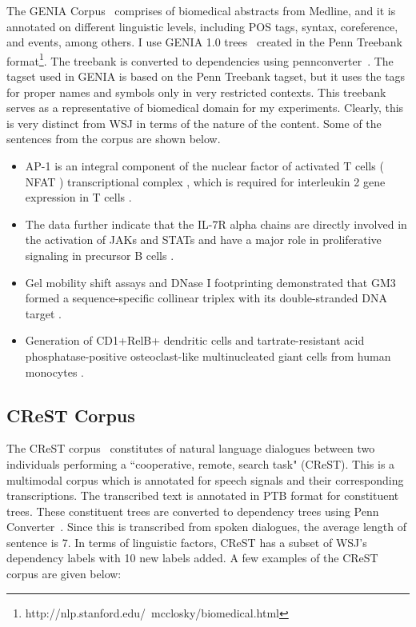 The GENIA Corpus~\citep{tateisi:tsujii:04} comprises of biomedical abstracts from Medline, and it is annotated on different linguistic levels, including POS tags, syntax, coreference, and events, among others. I use GENIA 1.0 trees~\cite{Ohta:2002:GCA:1289189.1289260} created in the Penn Treebank format\footnote{http://nlp.stanford.edu/~mcclosky/biomedical.html}. The treebank is converted to dependencies using pennconverter~\cite{johansson2007a}. The tagset used in GENIA is based on the Penn Treebank tagset, but it uses the tags for proper names and symbols only in very restricted contexts. This treebank serves as a representative of biomedical domain for my experiments. Clearly, this is very distinct from WSJ in terms of the nature of the content. Some of the sentences from the corpus are shown below.~
\begin{itemize}
    \item AP-1 is an integral component of the nuclear factor of activated T cells ( NFAT ) transcriptional complex , which is required for interleukin 2 gene expression in T cells .
    \item The data further indicate that the IL-7R alpha chains are directly involved in the activation of JAKs and STATs and have a major role in proliferative signaling in precursor B cells .
    \item Gel mobility shift assays and DNase I footprinting demonstrated that GM3 formed a sequence-specific collinear triplex with its double-stranded DNA target .
    \item Generation of CD1+RelB+ dendritic cells and tartrate-resistant acid phosphatase-positive osteoclast-like multinucleated giant cells from human monocytes . 
\end{itemize}

\subsection{CReST Corpus}

The CReST corpus~\citep{eberhard2010indiana} constitutes of natural language dialogues between two individuals performing a ``cooperative, remote, search task" (CReST). This is a multimodal corpus which is annotated for speech signals and their corresponding transcriptions. The transcribed text is annotated in PTB format for constituent trees. These constituent trees are converted to dependency trees using Penn Converter~\citep{johansson2007a}. Since this is transcribed from spoken dialogues, the average length of sentence is 7. In terms of linguistic factors, CReST has a subset of WSJ's dependency labels with 10 new labels added. A few examples of the CReST corpus are given below:


